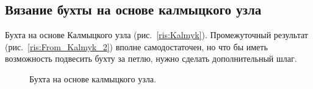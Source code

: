 \subsection{Вязание бухты на основе калмыцкого узла}


\begin{figure}[H]\centering
	\subfloat[Завязывание]{\label{ris:From_Kalmyk_1}
	\tcbox[enhanced jigsaw,colframe=black,opacityframe=0.5,opacityback=0.5]
		{\centering
			}
		}
\end{figure}

\begin{figure}[H]\centering
\end{figure}

Бухта на основе Калмыцкого узла (рис.~\ref{ris:Kalmyk}). Промежуточный результат (рис.~\ref{ris:From_Kalmyk_2}) вполне самодостаточен, но что бы иметь возможность подвесить бухту за петлю, нужно сделать дополнительный шлаг.

\begin{figure}[H]\centering
	\caption{Бухта на основе калмыцкого узла.}\label{ris:From_Kalmyk}
\end{figure}
